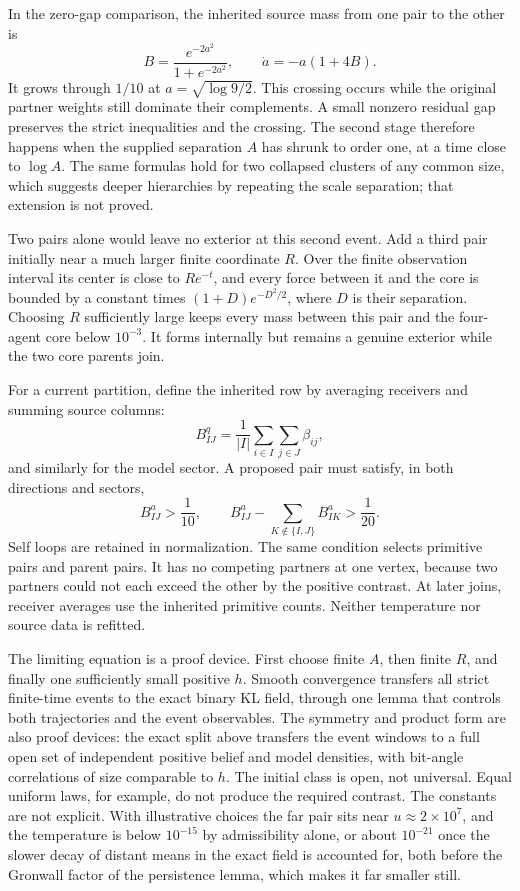 In the zero-gap comparison, the inherited source mass from one pair to the other is
\begin{equation}
B=\frac{e^{-2a^2}}{1+e^{-2a^2}},
\qquad \dot a=-a(1+4B).
\end{equation}
It grows through $1/10$ at $a=\sqrt{\log9/2}$. This crossing occurs while the original partner weights still dominate their complements. A small nonzero residual gap preserves the strict inequalities and the crossing. The second stage therefore happens when the supplied separation $A$ has shrunk to order one, at a time close to $\log A$. The same formulas hold for two collapsed clusters of any common size, which suggests deeper hierarchies by repeating the scale separation; that extension is not proved.

Two pairs alone would leave no exterior at this second event. Add a third pair initially near a much larger finite coordinate $R$. Over the finite observation interval its center is close to $Re^{-t}$, and every force between it and the core is bounded by a constant times $(1+D)e^{-D^2/2}$, where $D$ is their separation. Choosing $R$ sufficiently large keeps every mass between this pair and the four-agent core below $10^{-3}$. It forms internally but remains a genuine exterior while the two core parents join.

For a current partition, define the inherited row by averaging receivers and summing source columns:
\begin{equation}
B^q_{IJ}=\frac1{|I|}\sum_{i\in I}\sum_{j\in J}\beta_{ij},
\end{equation}
and similarly for the model sector. A proposed pair must satisfy, in both directions and sectors,
\begin{equation}
B^a_{IJ}>\frac1{10},\qquad
B^a_{IJ}-\sum_{K\notin\{I,J\}}B^a_{IK}>\frac1{20}.
\label{co:criterion}
\end{equation}
Self loops are retained in normalization. The same condition selects primitive pairs and parent pairs. It has no competing partners at one vertex, because two partners could not each exceed the other by the positive contrast. At later joins, receiver averages use the inherited primitive counts. Neither temperature nor source data is refitted.

The limiting equation is a proof device. First choose finite $A$, then finite $R$, and finally one sufficiently small positive $h$. Smooth convergence transfers all strict finite-time events to the exact binary KL field, through one lemma that controls both trajectories and the event observables. The symmetry and product form are also proof devices: the exact split above transfers the event windows to a full open set of independent positive belief and model densities, with bit-angle correlations of size comparable to $h$. The initial class is open, not universal. Equal uniform laws, for example, do not produce the required contrast. The constants are not explicit. With illustrative choices the far pair sits near $u\approx2\times10^7$, and the temperature is below $10^{-15}$ by admissibility alone, or about $10^{-21}$ once the slower decay of distant means in the exact field is accounted for, both before the Gronwall factor of the persistence lemma, which makes it far smaller still.

